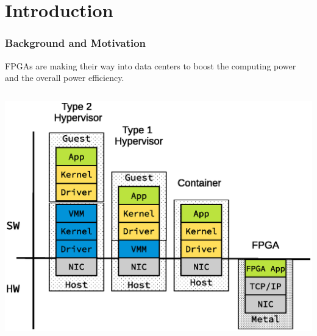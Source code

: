 \section{Introduction}
\begin{frame}
  \frametitle{Background and Motivation}

FPGAs are making their way into data centers to boost the computing power
	and the overall power efficiency.


\begin{columns}
\begin{column}{0.8\textwidth}
\includegraphics[scale=0.5]{./background/server_configuration.eps}
\end{column}


\end{columns}
\end{frame}
